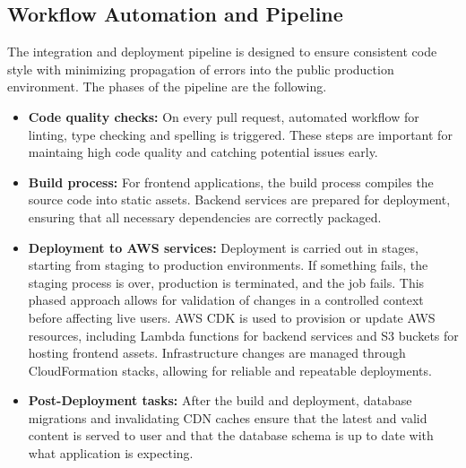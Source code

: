 \subsection{Workflow Automation and Pipeline}
\label{subsec:workflow-automation-pipeline}
The integration and deployment pipeline is designed to ensure consistent code style with minimizing propagation of errors into the public production environment.
The phases of the pipeline are the following.
\begin{itemize}
    \item \textbf{Code quality checks:} On every pull request, automated workflow for linting, type checking and spelling is triggered. These steps are important for maintaing high code quality and catching potential issues early.
    \item \textbf{Build process:} For frontend applications, the build process compiles the source code into static assets. Backend services are prepared for deployment, ensuring that all necessary dependencies are correctly packaged.
    \item \textbf{Deployment to AWS services:} Deployment is carried out in stages, starting from staging to production environments. If something fails, the staging process is over, production is terminated, and the job fails. This phased approach allows for validation of changes in a controlled context before affecting live users. \ac{AWS CDK} is used to provision or update \ac{AWS} resources, including Lambda functions for backend services and \ac{S3} buckets for hosting frontend assets. Infrastructure changes are managed through CloudFormation stacks, allowing for reliable and repeatable deployments.
    \item \textbf{Post-Deployment tasks:} After the build and deployment, database migrations and invalidating CDN caches ensure that the latest and valid content is served to user and that the database schema is up to date with what application is expecting.
\end{itemize}

